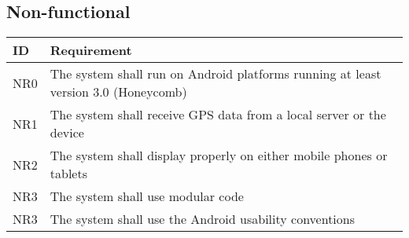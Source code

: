 \documentclass{article}
\begin{document}
\subsection{Non-functional}

\begin{tabular}{ | p{.5in} | p{5in} | }
\hline
\textbf{ID} & \textbf{Requirement}\\
\hline
\hline
NR0 & The system shall run on Android platforms running at least version 3.0 (Honeycomb)\\
\hline
NR1 & The system shall receive GPS data from a local server or the device\\
\hline
NR2 & The system shall display properly on either mobile phones or tablets\\
\hline
NR3 & The system shall use modular code\\
\hline
NR3 & The system shall use the Android usability conventions\\
\hline
\end{tabular}
\end{document}
